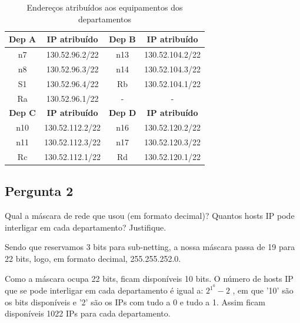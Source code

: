 \documentclass[11pt]{article}
\begin{document}
\begin{table}[htb!]
    \centering
    \begin{tabular}{|c|c|c|c|}
    \hline
    \textbf{Dep A} & \textbf{IP atribuído} & \textbf{Dep B} & \textbf{IP atribuído} \\ \hline
    n7             & 130.52.96.2/22        & n13            & 130.52.104.2/22       \\ \hline
    n8             & 130.52.96.3/22        & n14            & 130.52.104.3/22       \\ \hline
    S1             & 130.52.96.4/22        & Rb             & 130.52.104.1/22       \\ \hline
    Ra             & 130.52.96.1/22        & -              & -                     \\ \hline
    \textbf{Dep C} & \textbf{IP atribuído} & \textbf{Dep D} & \textbf{IP atribuído} \\ \hline
    n10            & 130.52.112.2/22       & n16            & 130.52.120.2/22       \\ \hline
    n11            & 130.52.112.3/22       & n17            & 130.52.120.3/22       \\ \hline
    Rc             & 130.52.112.1/22       & Rd             & 130.52.120.1/22       \\ \hline
    \end{tabular}
    \caption{Endereços atribuídos aos equipamentos dos departamentos}
\end{table}

\vspace{0.5cm}

\subsection{Pergunta 2}

Qual a máscara de rede que usou (em formato decimal)? Quantos hosts IP pode interligar em cada departamento? Justifique.

\vspace{0.5cm}

Sendo que reservamos 3 bits para sub-netting, a nossa máscara passa de 19 para 22 bits, logo, em formato decimal, 255.255.252.0.

Como a máscara ocupa 22 bits, ficam disponíveis 10 bits. O número de hosts IP que se pode interligar em cada departamento é igual a: $2^1^0 - 2$ , em que '10' são os bits disponíveis e '2' são os IPs com tudo a 0 e tudo a 1. Assim ficam disponíveis 1022 IPs para cada departamento.
\end{document}

